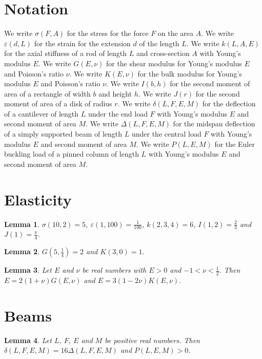 \documentclass{article}
\newtheorem{lemma}{Lemma}
\begin{document}
\section{Notation}

We write $\sigma(F,A)$ for the stress for the force $F$ on the area $A$.
We write $\varepsilon(d,L)$ for the strain for the extension $d$ of the length $L$.
We write $k(L,A,E)$ for the axial stiffness of a rod of length $L$ and cross-section $A$ with Young's modulus $E$.
We write $G(E,\nu)$ for the shear modulus for Young's modulus $E$ and Poisson's ratio $\nu$.
We write $K(E,\nu)$ for the bulk modulus for Young's modulus $E$ and Poisson's ratio $\nu$.
We write $I(b,h)$ for the second moment of area of a rectangle of width $b$ and height $h$.
We write $J(r)$ for the second moment of area of a disk of radius $r$.
We write $\delta(L,F,E,M)$ for the deflection of a cantilever of length $L$ under the end load $F$ with Young's modulus $E$ and second moment of area $M$.
We write $\Delta(L,F,E,M)$ for the midspan deflection of a simply supported beam of length $L$ under the central load $F$ with Young's modulus $E$ and second moment of area $M$.
We write $P(L,E,M)$ for the Euler buckling load of a pinned column of length $L$ with Young's modulus $E$ and second moment of area $M$.

\section{Elasticity}

\begin{lemma}\label{values}
$\sigma(10,2)=5$, $\varepsilon(1,100)=\frac{1}{100}$, $k(2,3,4)=6$, $I(1,2)=\frac23$ and $J(1)=\frac{\pi}{4}$.
\end{lemma}

\begin{lemma}\label{moduli}
$G(5,\frac14)=2$ and $K(3,0)=1$.
\end{lemma}

\begin{lemma}\label{relations}
Let $E$ and $\nu$ be real numbers with $E>0$ and $-1<\nu<\frac12$. Then $E=2(1+\nu)G(E,\nu)$ and $E=3(1-2\nu)K(E,\nu)$.
\end{lemma}

\section{Beams}

\begin{lemma}\label{beams}
Let $L$, $F$, $E$ and $M$ be positive real numbers. Then $\delta(L,F,E,M)=16\Delta(L,F,E,M)$ and $P(L,E,M)>0$.
\end{lemma}
\end{document}
